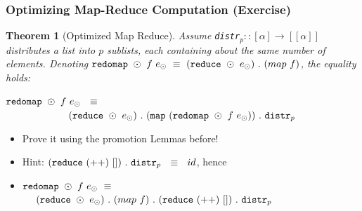 \documentclass{beamer}
\renewcommand{\emph}[1]{\textcolor{structure}{#1}}
\newcommand{\emp}[1]{\textcolor{DikuRed}{ #1}}
\newtheorem{mytheo}{Theorem}
\begin{document}
\begin{frame}[fragile,t]
  \frametitle{Optimizing Map-Reduce Computation (\alert{Exercise})}

\begin{mytheo}[Optimized Map Reduce]\label{MapRed}
Assume {\tt distr$_p :: [\alpha] \rightarrow [[\alpha]]$}
distributes a list into $p$ sublists, each containing about 
the same number of elements. Denoting  
${\tt redomap }\ \odot \ f \ e_{\odot} \ \equiv \ ({\tt reduce} \ \odot \ e_{\odot}) \ . \ (map \ f)$, the equality holds:\\\bigskip

\emp{${\tt redomap} \ \odot \ f \ e_{\odot} \ \ \equiv$}\\
\emp{$\ \ \ \ \ \ \ \ \ \ \ \ \ \ \ \ \ \ \ ({\tt reduce} \ \odot \ e_{\odot}) \ . \ ({\tt map} \ ({\tt redomap} \ \odot \ f \ e_{\odot})) \ . \ {\tt distr}_p$}
\end{mytheo}

\begin{itemize}
    \item \alert{Prove it using the promotion Lemmas before!}
    \item \emph{Hint: $({\tt reduce} \ (++) \ []) \ . \ {\tt distr}_p \ \ \equiv \ \ id$, hence}
    \item \emph{${\tt redomap }\ \odot \ f \ e_{\odot} \ \equiv$\\ $\ \ \ \ ({\tt reduce} \ \odot \ e_{\odot}) \ . \ (map \ f) \ . \ ({\tt reduce} \ (++) \ []) \ . \ {\tt distr}_p$}
\end  {itemize}

\end{frame}
\end{document}
